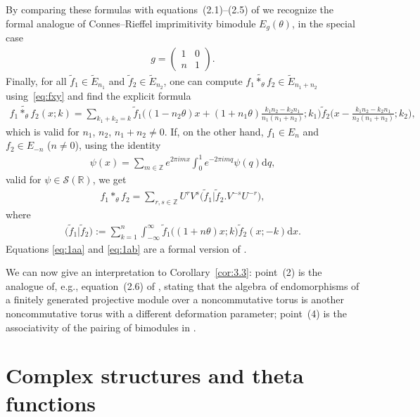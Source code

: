 \documentclass[pdftex]{sigma}
\numberwithin{equation}{section}
\theoremstyle{definition}
\newcommand{\R}{\mathbb{R}}
\newcommand{\Z}{\mathbb{Z}}
\newcommand{\mc}{\mathcal}
\newcommand{\de}{\mathrm{d}}
\begin{document}
By comparing these formulas with equations~(2.1)--(2.5) of \cite{Pla06} we recognize the formal analogue of Connes--Rief\/fel imprimitivity bimodule $E_g(\theta)$, in the special case
\begin{gather}\label{eq:gn}
g= \begin{pmatrix} 1 & 0 \\ n & 1 \end{pmatrix} .
\end{gather}
Finally, for all $\widetilde f_1\in \widetilde E_{n_1}$ and $\widetilde f_2\in\widetilde E_{n_2}$,
one can compute $\widetilde{f_1\ast_\theta f_2}\in\widetilde E_{n_1+n_2}$
using~\eqref{eq:fxy} and f\/ind the explicit formula
\begin{gather}\label{eq:1aa}
\widetilde{f_1\ast_\theta f_2}(x;k)=\sum_{k_1+k_2=k}\!\widetilde{f}_1\big((1-n_2\theta)x+(1+n_1\theta)\tfrac{k_1n_2-k_2n_1}{n_1(n_1+n_2)}
;k_1\big)\widetilde{f}_2\big(x
-\tfrac{k_1n_2-k_2n_1}{n_2(n_1+n_2)};k_2\big) ,\!\!\!
\end{gather}
which is valid for $n_1$, $n_2$, $n_1+n_2\neq 0$. If, on the other hand, $f_1\in E_n$ and $f_2\in E_{-n}$ ($n\neq 0$), using the identity
\begin{gather*}
\psi(x)=\sum_{m\in\Z}e^{2\pi imx}\int_0^1
e^{-2\pi imq}\psi(q)\de q ,
\end{gather*}
valid for $\psi\in\mc{S}(\R)$,
we get
\begin{gather}\label{eq:1ab}
f_1\ast_\theta f_2=
\sum_{r,s\in\Z}U^rV^s \big(\widetilde f_1\big|\widetilde f_2.V^{-s}U^{-r}\big),
\end{gather}
where
\begin{gather*}
\big(\widetilde f_1\big|\widetilde f_2\big):=\sum_{k=1}^n\int_{-\infty}^{\infty}
\widetilde f_1\big((1+n\theta)x;k\big)\widetilde f_2(x;-k)\de x .
\end{gather*}
Equations \eqref{eq:1aa} and \eqref{eq:1ab} are a formal version of \cite[Proposition~1.2(a)]{PS02}.

We can now give an interpretation to Corollary~\ref{cor:3.3}: point~(2) is the analogue of, e.g., equation~(2.6) of \cite{Pla06}, stating that the algebra of endomorphisms of a f\/initely generated projective module over a noncommutative torus is another noncommutative torus with a dif\/ferent deformation parameter; point~(4) is the associativity of the pairing of bimodules in \cite[Proposition~1.2(b)]{PS02}.

\section{Complex structures and theta functions}\label{sec:5}
\end{document}
